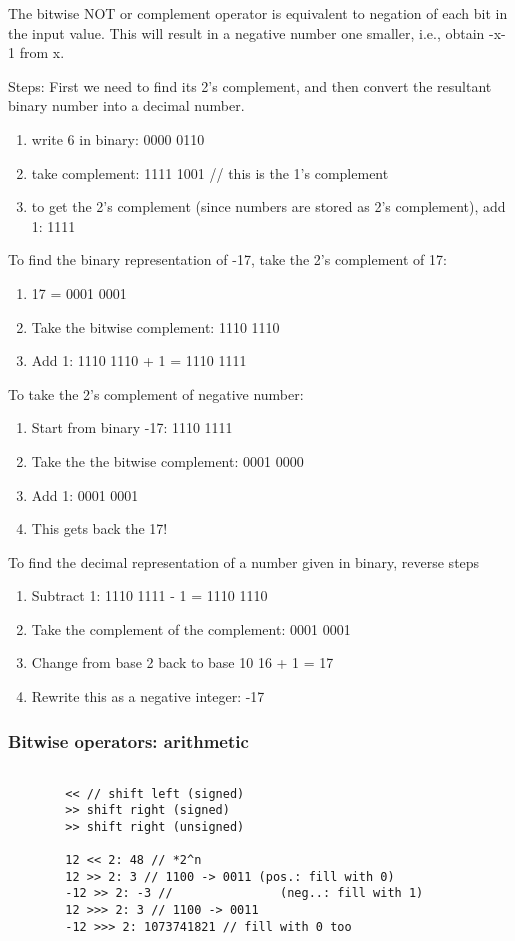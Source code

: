 \documentclass{scrartcl}
\begin{document}
    The bitwise NOT or complement operator is equivalent to negation of each bit in the input value. This will result in a negative number one smaller, i.e., obtain -x-1 from x.

    Steps: First we need to find its 2’s complement, and then convert the resultant binary number into a decimal number.

    \begin{enumerate}
        \item write 6 in binary: 0000 0110
        \item take complement: 1111 1001 // this is the 1's complement
        \item to get the 2's complement (since numbers are stored as 2’s complement), add 1: 1111
    \end{enumerate}

    To find the binary representation of -17, take the 2's complement of 17:
    \begin{enumerate}
        \item 17 = 0001 0001
        \item Take the bitwise complement: 1110 1110
        \item Add 1: 1110 1110 + 1 = 1110 1111
    \end{enumerate}

    To take the 2's complement of negative number:
    \begin{enumerate}
        \item Start from binary -17: 1110 1111
        \item     Take the the bitwise complement: 0001 0000
        \item     Add 1: 0001 0001
        \item     This gets back the 17!
    \end{enumerate}

    To find the decimal representation of a number given in binary, reverse steps
   \begin{enumerate}
       \item  Subtract 1: 1110 1111 - 1 = 1110 1110
       \item     Take the complement of the complement: 0001 0001
       \item     Change from base 2 back to base 10 16 + 1 = 17
       \item     Rewrite this as a negative integer: -17
   \end{enumerate}

\subsubsection{Bitwise operators: arithmetic}
    \begin{lstlisting}

        << // shift left (signed)
        >> shift right (signed)
        >> shift right (unsigned)

        12 << 2: 48 // *2^n
        12 >> 2: 3 // 1100 -> 0011 (pos.: fill with 0)
        -12 >> 2: -3 //               (neg..: fill with 1)
        12 >>> 2: 3 // 1100 -> 0011
        -12 >>> 2: 1073741821 // fill with 0 too
    \end{lstlisting}
\end{document}

